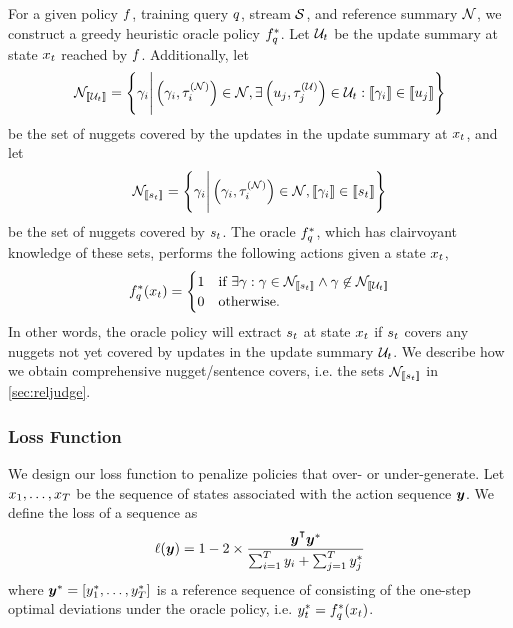 For a given policy $f$, training query $q$, stream $\mathcal{S}$,
and reference summary $\mathcal{N}$, we construct a greedy heuristic oracle
policy $f^*_{q}$.  Let $\mathcal{U}_t$ be the update summary at state
$x_t$ reached by $f$. Additionally, let
\[
\mathcal{N}_{\left\llbracket \mathcal{U}_t \right\rrbracket} = 
\left\{\gamma_i \Bigg\vert
        \left(\gamma_i,\tau^{(\mathcal{N})}_i\right) \in \mathcal{N},
         \exists \left(u_j, \tau^{(\mathcal{U})}_j\right) \in \mathcal{U}_t : \left\llbracket \gamma_i \right\rrbracket \in
        \left\llbracket u_j \right\rrbracket
       \right\}
\]
be the set of nuggets covered by the updates in the update summary at
$x_t$, and let
\[
\mathcal{N}_{\left\llbracket s_t \right\rrbracket} = 
\left\{\gamma_i \Bigg\vert
        \left(\gamma_i,\tau^{(\mathcal{N})}_i\right) \in \mathcal{N},
        \left\llbracket \gamma_i \right\rrbracket \in
        \left\llbracket s_t \right\rrbracket
       \right\}
\]
be the set of nuggets covered by $s_t$.  The oracle $f^*_{q}$,
which has clairvoyant knowledge of these sets, performs the following actions
given a state $x_t$,
\[
    f^*_{q}(x_t) = \begin{cases} 
        1 & \textrm{if }  
        \exists \gamma : \gamma \in \mathcal{N}_{\left\llbracket s_t \right\rrbracket} \wedge 
   \gamma \not\in \mathcal{N}_{\left\llbracket \mathcal{U}_t \right\rrbracket }
     \\
     0 & \textrm{otherwise.} \end{cases}
\]
In other words, the oracle policy will extract $s_t$ at state $x_t$
if $s_t$ covers any nuggets not yet covered by updates in the update
summary $\mathcal{U}_t$. We describe how we obtain comprehensive
nugget/sentence covers, i.e. the sets $\mathcal{N}_{\left\llbracket s_t \right\rrbracket}$ in
\autoref{sec:reljudge}.

\subsubsection{Loss Function}
We design our loss function to penalize policies that  over- or under-generate.
Let $x_1, \ldots, x_T$ be the sequence of states associated with the
action sequence $\boldsymbol{y}$.  We define the loss of a sequence as 
\begin{align*}
  \lossfunc(\bsals) = 1 - 2 \times 
    \frac{ \bsals^\T \bsals^* }{ \sum^T_{i=1} \bsal_i + \sum^T_{j=1}\bsal_j^* }
\end{align*}
where $\boldsymbol{y}^* = \left[y_1^*,\ldots, y_T^* \right]$ is a reference
sequence of consisting of the one-step optimal deviations under the oracle
policy, i.e. $y_t^* = f^*_{q}(x_t)$.

